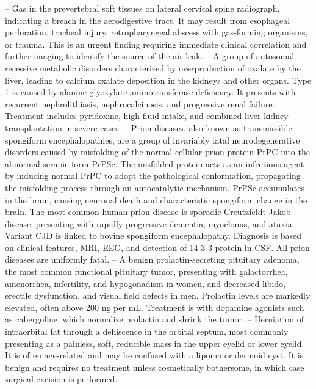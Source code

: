 -- Gas in the prevertebral soft tissues on lateral cervical spine radiograph, indicating a breach in the aerodigestive tract. It may result from esophageal perforation, tracheal injury, retropharyngeal abscess with gas-forming organisms, or trauma. This is an urgent finding requiring immediate clinical correlation and further imaging to identify the source of the air leak.
-- A group of autosomal recessive metabolic disorders characterized by overproduction of oxalate by the liver, leading to calcium oxalate deposition in the kidneys and other organs. Type 1 is caused by alanine-glyoxylate aminotransferase deficiency. It presents with recurrent nephrolithiasis, nephrocalcinosis, and progressive renal failure. Treatment includes pyridoxine, high fluid intake, and combined liver-kidney transplantation in severe cases.
-- Prion diseases, also known as transmissible spongiform encephalopathies, are a group of invariably fatal neurodegenerative disorders caused by misfolding of the normal cellular prion protein PrPC into the abnormal scrapie form PrPSc. The misfolded protein acts as an infectious agent by inducing normal PrPC to adopt the pathological conformation, propagating the misfolding process through an autocatalytic mechanism. PrPSc accumulates in the brain, causing neuronal death and characteristic spongiform change in the brain. The most common human prion disease is sporadic Creutzfeldt-Jakob disease, presenting with rapidly progressive dementia, myoclonus, and ataxia. Variant CJD is linked to bovine spongiform encephalopathy. Diagnosis is based on clinical features, MRI, EEG, and detection of 14-3-3 protein in CSF. All prion diseases are uniformly fatal.
-- A benign prolactin-secreting pituitary adenoma, the most common functional pituitary tumor, presenting with galactorrhea, amenorrhea, infertility, and hypogonadism in women, and decreased libido, erectile dysfunction, and visual field defects in men. Prolactin levels are markedly elevated, often above 200 ng per mL. Treatment is with dopamine agonists such as cabergoline, which normalize prolactin and shrink the tumor.
-- Herniation of intraorbital fat through a dehiscence in the orbital septum, most commonly presenting as a painless, soft, reducible mass in the upper eyelid or lower eyelid. It is often age-related and may be confused with a lipoma or dermoid cyst. It is benign and requires no treatment unless cosmetically bothersome, in which case surgical excision is performed.
